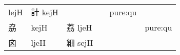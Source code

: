 \documentclass[14pt,a4paper]{scrartcl}
\begin{document}
\begin{longtable}[c]{@{}llllll@{}}
\begin{minipage}[t]{0.14\columnwidth}
lejH
\strut\end{minipage} &
\begin{minipage}[t]{0.14\columnwidth}\raggedright\strut
計 kejH
\strut\end{minipage} &
\begin{minipage}[t]{0.14\columnwidth}\raggedright\strut
\strut\end{minipage} &
\begin{minipage}[t]{0.14\columnwidth}\raggedright\strut
\strut\end{minipage} &
\begin{minipage}[t]{0.14\columnwidth}\raggedright\strut
pure:qu
\strut\end{minipage}\tabularnewline
\begin{minipage}[t]{0.14\columnwidth}\raggedright\strut
劦
\strut\end{minipage} &
\begin{minipage}[t]{0.14\columnwidth}\raggedright\strut
kejH
\strut\end{minipage} &
\begin{minipage}[t]{0.14\columnwidth}\raggedright\strut
荔 ljeH
\strut\end{minipage} &
\begin{minipage}[t]{0.14\columnwidth}\raggedright\strut
\strut\end{minipage} &
\begin{minipage}[t]{0.14\columnwidth}\raggedright\strut
\strut\end{minipage} &
\begin{minipage}[t]{0.14\columnwidth}\raggedright\strut
pure:qu
\strut\end{minipage}\tabularnewline
\begin{minipage}[t]{0.14\columnwidth}\raggedright\strut
囟
\strut\end{minipage} &
\begin{minipage}[t]{0.14\columnwidth}\raggedright\strut
ljeH
\strut\end{minipage} &
\begin{minipage}[t]{0.14\columnwidth}\raggedright\strut
細 sejH
\strut\end{minipage} &
\begin{minipage}[t]{0.14\columnwidth}\raggedright\strut
\strut\end{minipage} &
\begin{minipage}[t]{0.14\columnwidth}\raggedright\strut
\strut\end{minipage} &
\begin{minipage}[t]{0.14\columnwidth}\raggedright\strut

\end{minipage}
\end{longtable}
\end{document}
